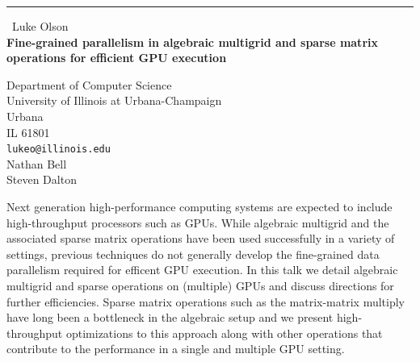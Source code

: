 \documentclass{report}
\begin{document}
\begin{center}
\rule{6in}{1pt} \
{\large Luke Olson \\
{\bf Fine-grained parallelism in algebraic multigrid and sparse matrix operations for efficient GPU execution}}

Department of Computer Science \\ University of Illinois at Urbana-Champaign \\ Urbana \\ IL 61801
\\
{\tt lukeo@illinois.edu}\\
Nathan Bell\\
Steven Dalton\end{center}

Next generation high-performance computing systems are expected to include
high-throughput processors such as GPUs. While algebraic multigrid and the
associated sparse matrix operations have been used successfully in a variety of
settings, previous techniques do not generally develop the fine-grained data
parallelism required for efficent GPU execution. In this talk we detail
algebraic multigrid and sparse operations on (multiple) GPUs and discuss
directions for further efficiencies. Sparse matrix operations such as the
matrix-matrix multiply have long been a bottleneck in the algebraic setup and
we present high-throughput optimizations to this approach along with other
operations that contribute to the performance in a single and multiple GPU
setting.
\end{document}
